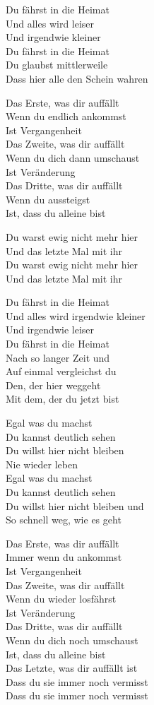 \documentclass[]{book}
\begin{document}
Du fährst in die Heimat\\
Und alles wird leiser\\
Und irgendwie kleiner\\
Du fährst in die Heimat\\
Du glaubst mittlerweile\\
Dass hier alle den Schein wahren

Das Erste, was dir auffällt\\
Wenn du endlich ankommst\\
Ist Vergangenheit\\
Das Zweite, was dir auffällt\\
Wenn du dich dann umschaust\\
Ist Veränderung\\
Das Dritte, was dir auffällt\\
Wenn du aussteigst\\
Ist, dass du alleine bist

Du warst ewig nicht mehr hier\\
Und das letzte Mal mit ihr\\
Du warst ewig nicht mehr hier\\
Und das letzte Mal mit ihr

Du fährst in die Heimat\\
Und alles wird irgendwie kleiner\\
Und irgendwie leiser\\
Du fährst in die Heimat\\
Nach so langer Zeit und\\
Auf einmal vergleichst du\\
Den, der hier weggeht\\
Mit dem, der du jetzt bist

Egal was du machst\\
Du kannst deutlich sehen\\
Du willst hier nicht bleiben\\
Nie wieder leben\\
Egal was du machst\\
Du kannst deutlich sehen\\
Du willst hier nicht bleiben und\\
So schnell weg, wie es geht

Das Erste, was dir auffällt\\
Immer wenn du ankommst\\
Ist Vergangenheit\\
Das Zweite, was dir auffällt\\
Wenn du wieder losfährst\\
Ist Veränderung\\
Das Dritte, was dir auffällt\\
Wenn du dich noch umschaust\\
Ist, dass du alleine bist\\
Das Letzte, was dir auffällt ist\\
Dass du sie immer noch vermisst\\
Dass du sie immer noch vermisst
\end{document}
